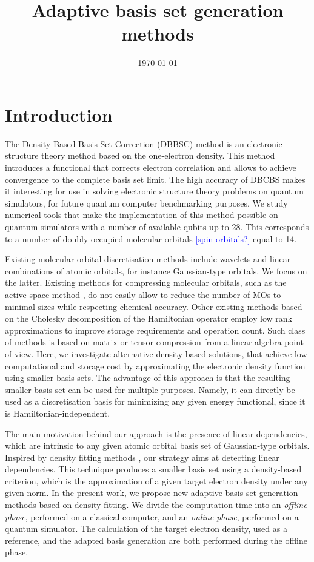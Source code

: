 \documentclass[a4paper,11pt]{article}
\title{Adaptive basis set generation methods}
\author{}
\date{\today}
\newcommand{\question}[1]{\textcolor{blue}{[#1]}}
\begin{document}
\maketitle

\section{Introduction}

The Density-Based Basis-Set Correction (DBBSC) method \cite{diata_phd}
is an electronic structure theory method based on the 
one-electron density. This method introduces a functional that corrects 
electron correlation and allows to achieve convergence to the
complete basis set limit. The high accuracy of DBCBS makes it interesting for 
use in solving electronic structure theory problems on quantum simulators, 
for future quantum computer benchmarking purposes. We study numerical tools that
make the implementation of this method possible on quantum simulators with a 
number of available qubits up to 28. This corresponds to a number of doubly 
occupied molecular orbitals \question{spin-orbitals?} equal to 14.

Existing molecular orbital discretisation methods include wavelets
\cite{genovese2022flexibilities} and linear combinations of atomic orbitals,
for instance Gaussian-type orbitals. We focus on the
latter. Existing methods for compressing molecular orbitals, such as the active space
method \cite{wang2023basis}, do not easily allow to reduce the number of MOs to
minimal sizes while respecting chemical accuracy. Other existing methods based on 
the Cholesky decomposition \cite{hummel2017low} of the Hamiltonian operator
employ low rank approximations to improve storage requirements and operation count. 
Such class of methods is based on matrix or tensor compression 
from a linear algebra point of view. Here, we investigate alternative 
density-based solutions, that achieve low computational and storage cost by 
approximating the electronic density function using smaller basis sets. 
The advantage of this approach is that the resulting smaller basis set 
can be used for multiple purposes. Namely, it can directly be used as a 
discretisation basis for minimizing any given energy functional, since it is 
Hamiltonian-independent. 

The main motivation behind our approach is the presence of linear dependencies,
which are intrinsic to any given atomic orbital basis set of Gaussian-type orbitals. 
Inspired by density fitting methods \cite{julien_df}, our strategy
aims at detecting linear dependencies. This technique produces a smaller basis set using a 
density-based criterion, which is the approximation of a given target electron density under 
any given norm. In the present work, we propose new adaptive basis set 
generation methods based on density fitting. We divide the computation time into
an \textit{offline phase}, performed on a classical computer, and an
\textit{online phase}, performed on a quantum simulator. The calculation of the
target electron density, used as a reference, and the adapted basis generation
are both performed during the offline phase.
\end{document}
